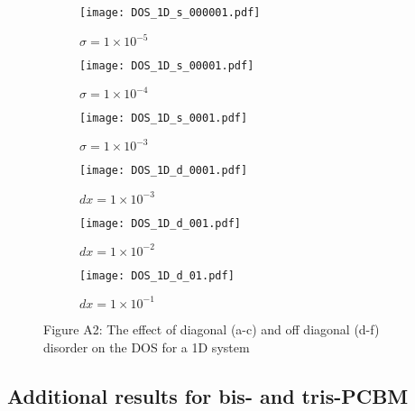 \documentclass[a4paper,12pt]{article}
\begin{document}
\begin{figure}[H]
\centering
\begin{subfigure}[b]{0.3\textwidth}
\texttt{[image: DOS\_1D\_s\_000001.pdf]}
\caption{$\sigma=1\times10^{-5}$}
\end{subfigure}
\begin{subfigure}[b]{0.3\textwidth}
\texttt{[image: DOS\_1D\_s\_00001.pdf]}
\caption{$\sigma=1\times10^{-4}$}
\end{subfigure}
\begin{subfigure}[b]{0.3\textwidth}
\texttt{[image: DOS\_1D\_s\_0001.pdf]}
\caption{$\sigma=1\times10^{-3}$}
\end{subfigure}
\begin{subfigure}[b]{0.3\textwidth}
\texttt{[image: DOS\_1D\_d\_0001.pdf]}
\caption{$dx=1\times10^{-3}$}
\end{subfigure}
\begin{subfigure}[b]{0.3\textwidth}
\texttt{[image: DOS\_1D\_d\_001.pdf]}
\caption{$dx=1\times10^{-2}$}
\end{subfigure}
\begin{subfigure}[b]{0.3\textwidth}
\texttt{[image: DOS\_1D\_d\_01.pdf]}
\caption{$dx=1\times10^{-1}$}
\end{subfigure}
\caption*{Figure A2: The effect of diagonal (a-c) and off diagonal (d-f) disorder on the DOS for a 1D system}
\label{fig:dis}
\end{figure}


\subsection{Additional results for bis- and tris-PCBM}
\end{document}
